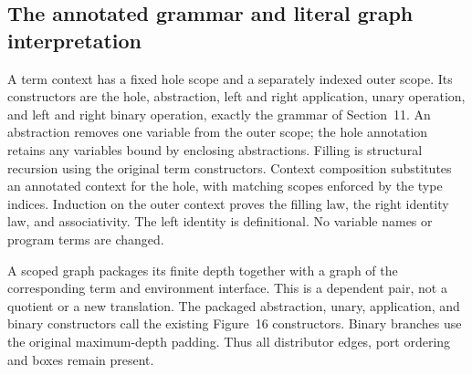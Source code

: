 









\subsection{The annotated grammar and literal graph interpretation}


A term context has a fixed hole scope and a separately indexed outer
scope. Its constructors are the hole, abstraction, left and right application,
unary operation, and left and right binary operation, exactly the grammar
of Section~11. An abstraction removes one variable from the outer scope;
the hole annotation retains any variables bound by enclosing abstractions.
Filling is structural recursion using the original term constructors.
Context composition substitutes an annotated context for the hole, with
matching scopes enforced by the type indices. Induction on the outer context
proves the filling law, the right identity law, and associativity. The left
identity is definitional. No variable names or program terms are changed.













A scoped graph packages its finite depth together with a graph of the
corresponding term and environment interface. This is a dependent pair, not a
quotient or a new translation. The packaged abstraction, unary, application,
and binary constructors call the existing Figure~16 constructors. Binary
branches use the original maximum-depth padding. Thus all distributor edges,
port ordering and boxes remain present.

